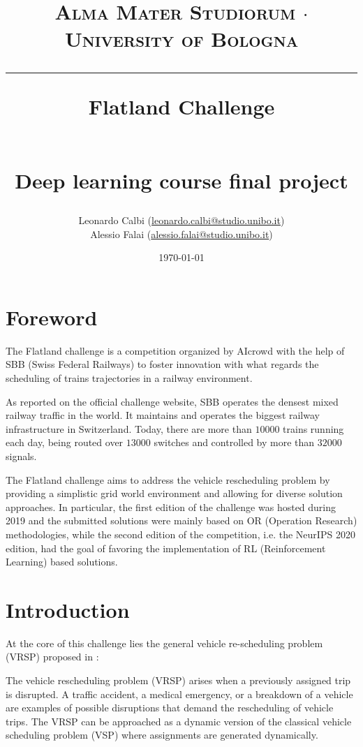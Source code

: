 \documentclass[a4paper,10pt]{report}
\begin{document}
\frenchspacing

\title{
	{{\large{\textsc{Alma Mater Studiorum $\cdot$ University of Bologna}}}}
	\rule{\textwidth}{0.4pt}\vspace{3mm}
	\textbf{Flatland Challenge} 
	\begin{figure}[!htb]
		\centering
		
	\end{figure} \\
	Deep learning course final project
}

\author{Leonardo Calbi (\href{mailto:leonardo.calbi@studio.unibo.it}{leonardo.calbi@studio.unibo.it}) \\ Alessio Falai (\href{mailto:alessio.falai@studio.unibo.it}{alessio.falai@studio.unibo.it})}
\date{\today}
\maketitle
\newpage
\tableofcontents
\listoffigures
\newpage


\chapter*{Foreword}
The Flatland challenge is a competition organized by AIcrowd \cite{aicrowd} with the help of SBB (Swiss Federal Railways) to foster innovation with what regards the scheduling of trains trajectories in a railway environment. 

As reported on the official challenge website, SBB operates the densest mixed railway traffic in the world. It maintains and operates the biggest railway infrastructure in Switzerland. Today, there are more than $10000$ trains running each day, being routed over $13000$ switches and controlled by more than $32000$ signals. 

The Flatland challenge aims to address the vehicle rescheduling problem by providing a simplistic grid world environment and allowing for diverse solution approaches. In particular, the first edition of the challenge was hosted during 2019 and the submitted solutions were mainly based on OR (Operation Research) methodologies, while the second edition of the competition, i.e. the NeurIPS 2020 edition, had the goal of favoring the implementation of RL (Reinforcement Learning) based solutions.  


\chapter{Introduction}
At the core of this challenge lies the general vehicle re-scheduling problem (VRSP) proposed \citeauthor{vrsp} in \citeyear{vrsp} \cite{vrsp}:
\begin{displayquote}
	The vehicle rescheduling problem (VRSP) arises when a previously assigned trip is disrupted. A traffic accident, a medical emergency, or a breakdown of a vehicle are examples of possible disruptions that demand the rescheduling of vehicle trips. The VRSP can be approached as a dynamic version of the classical vehicle scheduling problem (VSP) where assignments are generated dynamically.
\end{displayquote}
\end{document}
